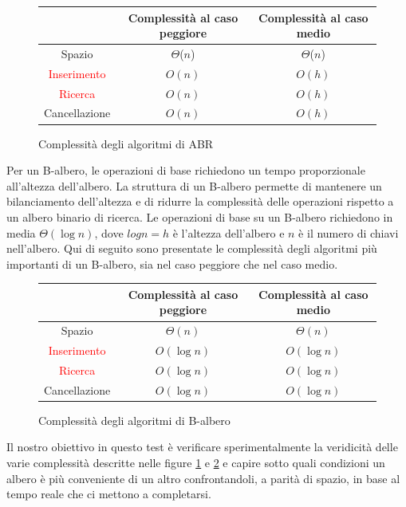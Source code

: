 \begin{figure}[H]
    \centering
    \begin{tabular}{|c|c|c|}
        \hline
         & Complessità al caso peggiore & Complessità al caso medio\\
        \hline
        Spazio & $\Theta$($n$) & $\Theta$($n$)\\
        \hline
        \textcolor{red}{Inserimento} & $O(n)$ & $O(h)$\\
        \hline
        \textcolor{red}{Ricerca} & $O(n)$ & $O(h)$\\
        \hline
        Cancellazione & $O(n)$ & $O(h)$\\
        \hline
    \end{tabular}
    \caption{Complessità degli algoritmi di ABR}
    \label{fig:ComplessitàABR}
\end{figure}

Per un B-albero, le operazioni di base richiedono un tempo proporzionale all'altezza dell'albero. La struttura di un B-albero permette di mantenere un bilanciamento dell'altezza e di ridurre la complessità delle operazioni rispetto a un albero binario di ricerca. Le operazioni di base su un B-albero richiedono in media \(\Theta(\log n)\), dove \(logn=h\) è l'altezza dell'albero e \(n\) è il numero di chiavi nell'albero. Qui di seguito sono presentate le complessità degli algoritmi più importanti di un B-albero, sia nel caso peggiore che nel caso medio.

\begin{figure}[H]
    \centering
    \begin{tabular}{|c|c|c|}
        \hline
         & Complessità al caso peggiore & Complessità al caso medio\\
        \hline
        Spazio & \(\Theta(n)\) & \(\Theta(n)\)\\
        \hline
        \textcolor{red}{Inserimento} & \(O(\log n)\) & \(O(\log n)\)\\
        \hline
        \textcolor{red}{Ricerca} & \(O(\log n)\) & \(O(\log n)\)\\
        \hline
        Cancellazione & \(O(\log n)\) & \(O(\log n)\)\\
        \hline
    \end{tabular}
    \caption{Complessità degli algoritmi di B-albero}
    \label{fig:ComplessitàBA}
\end{figure}


Il nostro obiettivo in questo test è verificare sperimentalmente la veridicità delle varie complessità descritte nelle figure \ref{fig:ComplessitàABR} e \ref{fig:ComplessitàBA} e capire sotto quali condizioni un albero è più conveniente di un altro confrontandoli, a parità di spazio, in base al tempo reale che ci mettono a completarsi.





